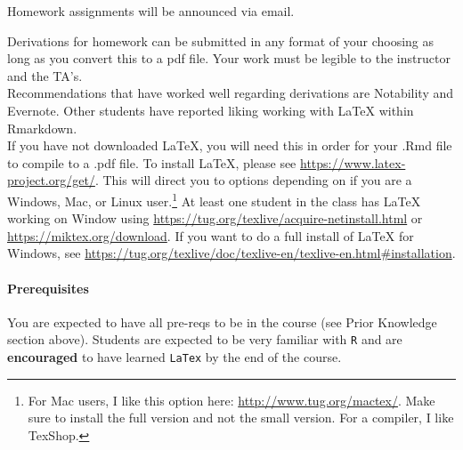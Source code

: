 \documentclass[11pt]{article}
\begin{document}
Homework assignments will be announced via email.



Derivations for homework can be submitted in any format of your choosing as long as you convert this to a pdf file. Your work must be legible to the instructor and the TA's. \\

Recommendations that have worked well regarding derivations are Notability and Evernote. Other students have reported liking working with LaTeX within Rmarkdown. \\

If you have not downloaded LaTeX, you will need this in order for your .Rmd file to compile to a .pdf file. To install LaTeX, please see \url{https://www.latex-project.org/get/}. This will direct you to options depending on if you are a Windows, Mac, or Linux user.\footnote{For Mac users, I like this option here: \url{http://www.tug.org/mactex/}. Make sure to install the full version and not the small version. For a compiler, I like TexShop.}  At least one student in the class has LaTeX working on Window using \url{https://tug.org/texlive/acquire-netinstall.html} or \url{https://miktex.org/download}. If you want to do a full install of LaTeX for Windows, see \url{https://tug.org/texlive/doc/texlive-en/texlive-en.html#installation}.


\paragraph{Prerequisites}

You are expected to have all pre-reqs to be in the course (see Prior Knowledge section above). Students are expected to be very familiar with \texttt{R} and are \textbf{encouraged} to have learned \texttt{LaTex} by the end of the course.
\end{document}
